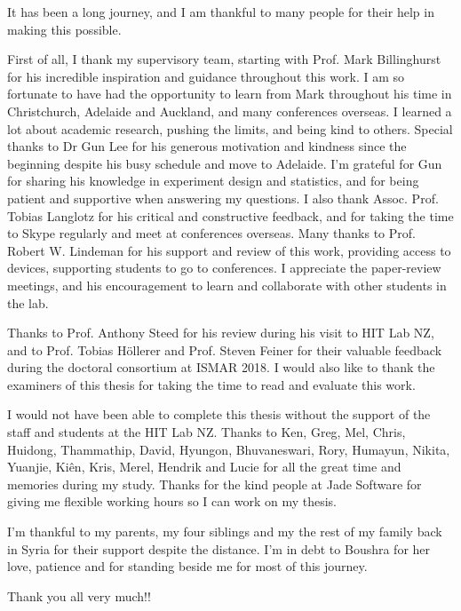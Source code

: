 \begin{acknowledgements}
\addchaptertocentry{\acknowledgementname} %
It has been a long journey, and I am thankful to many people for their help in making this possible.

First of all, I thank my supervisory team, starting with Prof. Mark Billinghurst for his incredible inspiration and guidance throughout this work. I am so fortunate to have had the opportunity to learn from Mark throughout his time in Christchurch, Adelaide and Auckland, and many conferences overseas. I learned a lot about academic research, pushing the limits, and being kind to others. 
Special thanks to Dr Gun Lee for his generous motivation and kindness since the beginning despite his busy schedule and move to Adelaide. I'm grateful for Gun for sharing his knowledge in experiment design and statistics, and for being patient and supportive when answering my questions. 
I also thank Assoc. Prof. Tobias Langlotz for his critical and constructive feedback, and for taking the time to Skype regularly and meet at conferences overseas.
Many thanks to Prof. Robert W. Lindeman for his support and review of this work, providing access to devices, supporting students to go to conferences. I appreciate the paper-review meetings, and his encouragement to learn and collaborate with other students in the lab. 

Thanks to Prof. Anthony Steed for his review during his visit to HIT Lab NZ, and to Prof. Tobias Höllerer and Prof. Steven Feiner for their valuable feedback during the doctoral consortium at ISMAR 2018. I would also like to thank the examiners of this thesis for taking the time to read and evaluate this work. 

I would not have been able to complete this thesis without the support of the staff and students at the HIT Lab NZ. Thanks to Ken, Greg, Mel, Chris, Huidong, Thammathip, David, Hyungon, Bhuvaneswari, Rory, Humayun, Nikita, Yuanjie, Kiên, Kris, Merel, Hendrik and Lucie for all the great time and memories during my study. Thanks for the kind people at Jade Software for giving me flexible working hours so I can work on my thesis.

I'm thankful to my parents, my four siblings and my the rest of my family back in Syria for their support despite the distance.
I'm in debt to Boushra for her love, patience and for standing beside me for most of this journey. 

Thank you all very much!!
\end{acknowledgements}